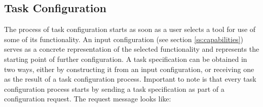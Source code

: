 \documentclass{article}
\begin{document}

  \subsection{Task Configuration} \label{ss:task_configuration}


   The process of task configuration starts as soon as a user selects a tool
   for use of some of its functionality.  An input configuration (see section
   \ref{ss:capabilities}) serves as a concrete representation of the selected
   functionality and represents the starting point of further configuration. A
   task specification can be obtained in two ways, either by constructing it
   from an input configuration, or receiving one as the result of a task
   configuration process. Important to note is that every task configuration
   process starts by sending a task specification as part of a configuration
   request. The request message looks like:

   
\end{document}
